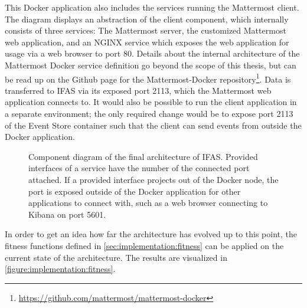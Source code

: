 This Docker application also includes the services running the Mattermost client.
The diagram displays an abstraction of the client component, which internally consists of three services:
The Mattermost server, the customized Mattermost web application, and an NGINX service which exposes the web application for usage via a web browser to port 80.
Details about the internal architecture of the Mattermost Docker service definition go beyond the scope of this thesis, but can be read up on the Github page for the Mattermost-Docker repository\footnote{\url{https://github.com/mattermost/mattermost-docker}}.
Data is transferred to \ac{IFAS} via its exposed port 2113, which the Mattermost web application connects to.
It would also be possible to run the client application in a separate environment; the only required change would be to expose port 2113 of the Event Store container such that the client can send events from outside the Docker application.

\begin{figure}[ht]
        \caption[Component diagram of the final architecture of \ac{IFAS}.]{
        Component diagram of the final architecture of \ac{IFAS}.
        Provided interfaces of a service have the number of the connected port attached.
        If a provided interface projects out of the Docker node, the port is exposed outside of the Docker application for other applications to connect with, such as a web browser connecting to Kibana on port 5601.}
        \label{figure:design:architecture}
\end{figure}

In order to get an idea how far the architecture has evolved up to this point, the fitness functions defined in \cref{sec:implementation:fitness} can be applied on the current state of the architecture.
The results are visualized in \cref{figure:implementation:fitness}.


